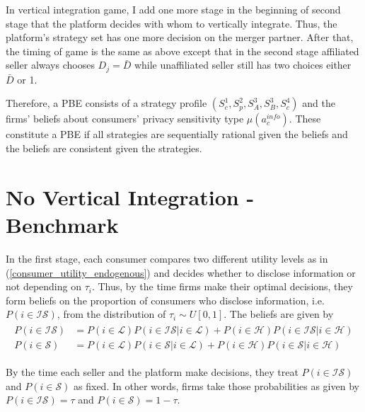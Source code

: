 \documentclass[12pt]{article}
\begin{document}
In vertical integration game, I add one more stage in the beginning of second stage that the platform decides with whom to vertically integrate. Thus, the platform's strategy set has one more decision on the merger partner. After that, the timing of game is the same as above except that in the second stage affiliated seller always chooses $D_j = \bar{D}$ while unaffiliated seller still has two choices either $\bar{D}$ or 1. 

Therefore, a PBE consists of a strategy profile $(S_c^1, S_p^2, S_A^3, S_B^3, S_c^4)$ and the firms' beliefs about consumers' privacy sensitivity type $\mu(a_c^{info})$. These constitute a PBE if all strategies are sequentially rational given the beliefs and the beliefs are consistent given the strategies.


	\section{No Vertical Integration - Benchmark}
In the first stage, each consumer compares two different utility levels as in (\ref{consumer_utility_endogenous}) and decides whether to disclose information or not depending on $\tau_i$. Thus, by the time firms make their optimal decisions, they form beliefs on the proportion of consumers who disclose information, i.e. $P(i \in \mathcal{IS})$, from the distribution of $\tau_i \sim U[0,1]$. The beliefs are given by 
\begin{align}\label{beliefs}
\begin{aligned}
P(i \in \mathcal{IS}) &= P(i \in \mathcal{L}) P(i \in \mathcal{IS}|i \in \mathcal{L})+P(i \in \mathcal{H})P(i \in \mathcal{IS}|i \in \mathcal{H})\\
P(i \in \mathcal{S}) &= P(i \in \mathcal{L}) P(i \in \mathcal{S}|i \in \mathcal{L})+P(i \in \mathcal{H})P(i \in \mathcal{S}|i \in \mathcal{H})
\end{aligned}
\end{align}

By the time each seller and the platform make decisions, they treat $P(i \in \mathcal{IS})$ and $P(i \in \mathcal{S})$ as fixed. In other words, firms take those probabilities as given by $P(i \in \mathcal{IS}) = \tau$ and $P(i \in \mathcal{S})=1-\tau$. 
\end{document}
